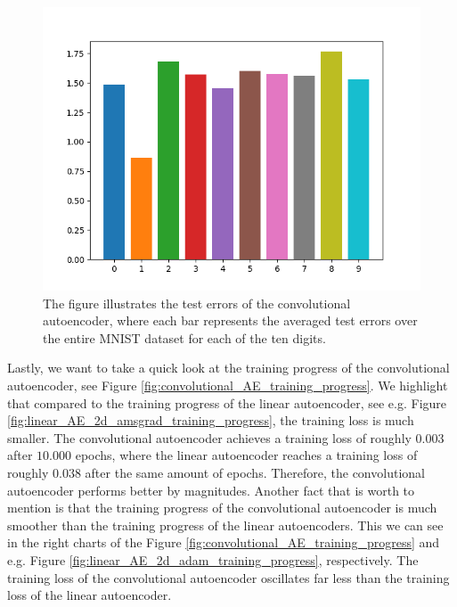 \begin{figure}
\begin{center}
      \includegraphics[width=0.49\linewidth]{convolutional_AE_errors}
\end{center}
\caption{The figure illustrates the test errors of the convolutional autoencoder, where each bar represents the averaged test errors over the entire MNIST dataset for each of the ten digits.}\label{fig:convolutional_AE_errors}
\end{figure}

Lastly, we want to take a quick look at the training progress of the convolutional autoencoder, see Figure \ref{fig:convolutional_AE_training_progress}. We highlight that compared to the training progress of the linear autoencoder, see e.g. Figure \ref{fig:linear_AE_2d_amsgrad_training_progress}, the training loss is much smaller. The convolutional autoencoder achieves a training loss of roughly $0.003$ after $10.000$ epochs, where the linear autoencoder reaches a training loss of roughly $0.038$ after the same amount of epochs. Therefore, the convolutional autoencoder performs better by magnitudes. Another fact that is worth to mention is that the training progress of the convolutional autoencoder is much smoother than the training progress of the linear autoencoders. This we can see in the right charts of the Figure \ref{fig:convolutional_AE_training_progress} and e.g. Figure \ref{fig:linear_AE_2d_adam_training_progress}, respectively. The training loss of the convolutional autoencoder oscillates far less than the training loss of the linear autoencoder.

